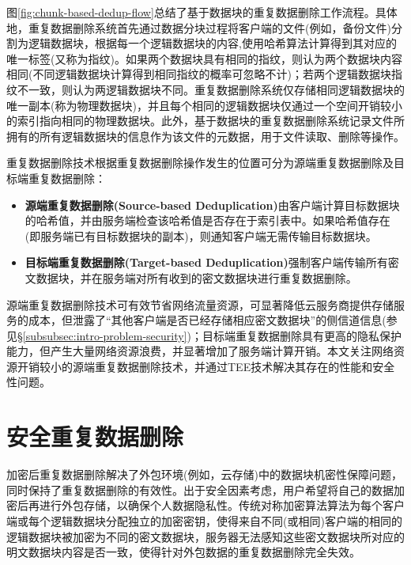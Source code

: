 图\ref{fig:chunk-based-dedup-flow}总结了基于数据块的重复数据删除工作流程。具体地，重复数据删除系统首先通过数据分块过程将客户端的文件(例如，备份文件)分割为逻辑数据块，根据每一个逻辑数据块的内容,使用哈希算法计算得到其对应的唯一标签(又称为指纹)。如果两个数据块具有相同的指纹，则认为两个数据块内容相同(不同逻辑数据块计算得到相同指纹的概率可忽略不计\cite{black2006compare})；若两个逻辑数据块指纹不一致，则认为两逻辑数据块不同。重复数据删除系统仅存储相同逻辑数据块的唯一副本(称为物理数据块)，并且每个相同的逻辑数据块仅通过一个空间开销较小的索引指向相同的物理数据块。此外，基于数据块的重复数据删除系统记录文件所拥有的所有逻辑数据块的信息作为该文件的元数据，用于文件读取、删除等操作。

重复数据删除技术根据重复数据删除操作发生的位置可分为源端重复数据删除及目标端重复数据删除\cite{IDC2010Data}：

\begin{itemize}[leftmargin=0em]
    \item \textbf{源端重复数据删除(Source-based Deduplication)}由客户端计算目标数据块的哈希值，并由服务端检查该哈希值是否存在于索引表中。如果哈希值存在(即服务端已有目标数据块的副本)，则通知客户端无需传输目标数据块。
    \item \textbf{目标端重复数据删除(Target-based Deduplication)}强制客户端传输所有密文数据块，并在服务端对所有收到的密文数据块进行重复数据删除。
\end{itemize}

源端重复数据删除技术可有效节省网络流量资源，可显著降低云服务商提供存储服务的成本，但泄露了“其他客户端是否已经存储相应密文数据块”的侧信道信息(参见\S\ref{subsubsec:intro-problem-security})；目标端重复数据删除具有更高的隐私保护能力，但产生大量网络资源浪费，并显著增加了服务端计算开销。本文关注网络资源开销较小的源端重复数据删除技术，并通过TEE技术解决其存在的性能和安全性问题。

\section{安全重复数据删除}
\label{sec:background-enc-deduplication}

加密后重复数据删除解决了外包环境(例如，云存储)中的数据块机密性保障问题，同时保持了重复数据删除的有效性。出于安全因素考虑，用户希望将自己的数据加密后再进行外包存储，以确保个人数据隐私性。传统对称加密算法算法为每个客户端或每个逻辑数据块分配独立的加密密钥，使得来自不同(或相同)客户端的相同的逻辑数据块被加密为不同的密文数据块，服务器无法感知这些密文数据块所对应的明文数据块内容是否一致，使得针对外包数据的重复数据删除完全失效。

